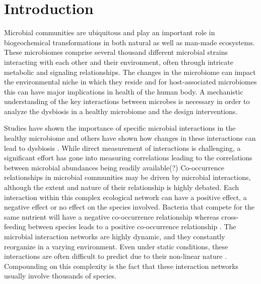 
\section*{Introduction}

  Microbial communities are ubiquitous and play an important role in biogeochemical transformations in both natural as well as man-made ecosystems.
  These microbiomes comprise several thousand different microbial strains interacting with each other and their environment, often through intricate metabolic and signaling relationships.
  The changes in the microbiome can impact the environmental niche in which they reside \cite{HumanMicrobiomeProjectConsortium2012,Lloyd-Price2016} and for host-associated microbiomes this can have major implications in health of the human body.
  A mechanistic understanding of the key interactions between microbes is necessary in order to analyze the dysbiosis in a healthy microbiome and the design interventions.

  Studies have shown the importance of specific microbial interactions in the healthy microbiome \cite{Lloyd-Price2016} and others have shown how changes in these interactions can lead to dysbiosis \cite{Wang2017,Gilbert2016,Belizario2015}.
  While direct measurement of interactions is challenging, a significant effort has gone into measuring correlations leading to the correlations between microbial abundances being readily available(?)
  Co-occurrence relationships in microbial communities may be driven by microbial interactions, although the extent and nature of their relationship is highly debated.
  Each interaction within this complex ecological network can have a positive effect, a negative effect or no effect on the species involved.
  Bacteria that compete for the same nutrient will have a negative co-occurrence relationship \cite{Ghoul2016} whereas cross-feeding between species leads to a positive co-occurrence relationship \cite{DSouza2018}.
  The microbial interaction networks are highly dynamic, and they constantly reorganize in a varying environment.
  Even under static conditions, these interactions are often difficult to predict due to their non-linear nature \cite{Konopka2015}.
  Compounding on this complexity is the fact that these interaction networks usually involve thousands of species.

